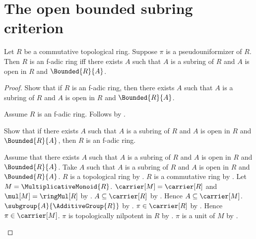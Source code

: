 \section{The open bounded subring criterion}

\begin{theorem}\label{f_adic_ring_iff_open_bounded_subring}
    Let $R$ be a commutative topological ring.
    Suppose $\pi$ is a pseudouniformizer of $R$.
    Then $R$ is an f-adic ring iff there exists $A$ such that
        $A$ is a subring of $R$ and $A$ is open in $R$ and
        $\Bounded{R}{A}$.
\end{theorem}
\begin{proof}
    Show that if $R$ is an f-adic ring, then there exists $A$ such that
        $A$ is a subring of $R$ and $A$ is open in $R$ and
        $\Bounded{R}{A}$.
    \begin{subproof}
        Assume $R$ is an f-adic ring.
        Follows by .
    \end{subproof}

    Show that if there exists $A$ such that $A$ is a subring of $R$ and
        $A$ is open in $R$ and $\Bounded{R}{A}$, then
        $R$ is an f-adic ring.
    \begin{subproof}
        Assume that there exists $A$ such that $A$ is a subring of $R$ and
            $A$ is open in $R$ and $\Bounded{R}{A}$.
        Take $A$ such that $A$ is a subring of $R$ and
            $A$ is open in $R$ and $\Bounded{R}{A}$.
        $R$ is a topological ring by
            .
        $R$ is a commutative ring by
            .
        Let $M=\MultiplicativeMonoid{R}$.
        $\carrier[M]=\carrier[R]$ and $\mul[M]=\ringMul[R]$ by
            .
        $A\subseteq\carrier[R]$ by .
        Hence $A\subseteq\carrier[M]$.
        $\subgroup{A}{\AdditiveGroup{R}}$ by
            .
        $\pi\in\carrier[R]$ by .
        Hence $\pi\in\carrier[M]$.
        $\pi$ is topologically nilpotent in $R$ by
            .
        $\pi$ is a unit of $M$ by
            .


\end{subproof}
\end{proof}
